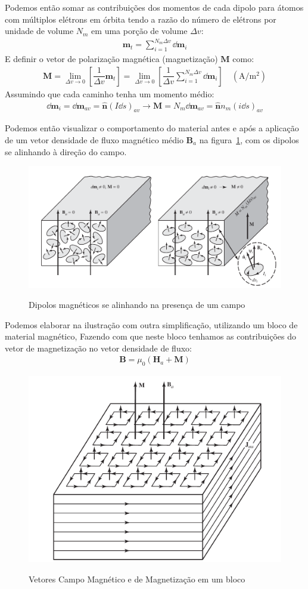 \documentclass[
        12pt,                           %
        openright,                      %
        twoside,                        %
        a4paper,                        %
        english,                        %
        french,                         %
        spanish,                        %
        brazil                          %
        ]{abntex2}
\begin{document}
Podemos então somar as contribuições dos momentos de cada dipolo para átomos com
múltiplos elétrons em órbita tendo a razão do número de elétrons por unidade de
volume $N_m$ em uma porção de volume $\Delta v$:
\begin{gather}
\bm{m}_t = \sum_{i = 1}^{N_m \Delta v}{\dd{\bm{m}_i}}
\end{gather}
E definir o vetor de polarização magnética (magnetização) $\bm{M}$ como:
\begin{gather}
  \bm{M} = \underset{\Delta v \to 0}{\lim} \left[ \dfrac{1}{\Delta v}\bm{m}_t \right] = 
  \underset{\Delta v \to 0}{\lim} \left[ \dfrac{1}{\Delta v} \sum_{i = 1}^{N_m \Delta v}{\dd{\bm{m}_i}} \right]
  \quad (\text{A}/\text{m}^2)
\end{gather}
Assumindo que cada caminho tenha um momento médio:
\begin{gather}
  \dd \bm{m}_i = \dd \bm{m}_{av} = \bm{\hat{n}}(I \dd s)_{av} \to
  \bm{M} = N_m \dd \bm{m}_{av} = \bm{\hat{n}} n_m (i \dd s)_{av}
\end{gather}

Podemos então visualizar o comportamento do material antes e após a aplicação de um
vetor densidade de fluxo magnético médio $\bm{B}_a$ na figura~\ref{fig:chap:embasamento:4},
com os dipolos se alinhando à direção do campo.

\begin{figure}[!htp]
  \centering
  \includegraphics[width=0.5\columnwidth]{balanis2.png}
  \label{fig:chap:embasamento:4}
  \caption{Dipolos magnéticos se alinhando na presença de um campo \cite{book:balanis}}
\end{figure}

Podemos elaborar na ilustração com outra simplificação, utilizando um bloco de material
magnético, Fazendo com que neste bloco tenhamos as contribuições do vetor de magnetização
no vetor densidade de fluxo:
\begin{gather}
  \bm{B} = \mu_0 (\bm{H}_a + \bm{M})
\end{gather}

\begin{figure}[!htp]
  \centering
  \includegraphics[width=0.5\columnwidth]{balanis.png}
  \label{fig:chap:embasamento:5}
  \caption{Vetores Campo Magnético e de Magnetização em um bloco \cite{book:balanis}}
\end{figure}
\end{document}

